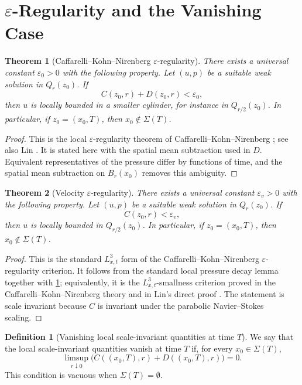 \documentclass[11pt]{amsart}
\theoremstyle{plain}
\newtheorem{theorem}{Theorem}[section]
\theoremstyle{definition}
\newtheorem{definition}[definition]{Definition}
\theoremstyle{remark}
\begin{document}
\section{\texorpdfstring{\(\varepsilon\)-Regularity}{Epsilon-Regularity} and the Vanishing Case}

\begin{theorem}[Caffarelli--Kohn--Nirenberg \(\varepsilon\)-regularity]
\label{thm:ckn}
There exists a universal constant \(\varepsilon_0>0\) with the
following property.  Let \((u,p)\) be a suitable weak solution in \(Q_r(z_0)\).
If
\[
  C(z_0,r)+D(z_0,r)<\varepsilon_0,
\]
then \(u\) is locally bounded in a smaller cylinder, for instance in
\(Q_{r/2}(z_0)\).  In particular, if \(z_0=(x_0,T)\), then
\(x_0\notin\Sigma(T)\).
\end{theorem}

\begin{proof}
This is the local \(\varepsilon\)-regularity theorem of
Caffarelli--Kohn--Nirenberg \cite{CKN1982}; see also Lin \cite{Lin1998}.  It is
stated here with the spatial mean subtraction used in \(D\).  Equivalent
representatives of the pressure differ by functions of time, and the spatial
mean subtraction on \(B_r(x_0)\) removes this ambiguity.
\end{proof}

\begin{theorem}[Velocity \(\varepsilon\)-regularity]\label{thm:velocity-ckn}
There exists a universal constant \(\varepsilon_v>0\) with the following
property.  Let \((u,p)\) be a suitable weak solution in \(Q_r(z_0)\).  If
\[
  C(z_0,r)<\varepsilon_v,
\]
then \(u\) is locally bounded in \(Q_{r/2}(z_0)\).  In particular, if
\(z_0=(x_0,T)\), then \(x_0\notin\Sigma(T)\).
\end{theorem}

\begin{proof}
This is the standard \(L^3_{x,t}\) form of the Caffarelli--Kohn--Nirenberg
\(\varepsilon\)-regularity criterion.  It follows from the standard local
pressure decay lemma together with \cref{thm:ckn}; equivalently, it is the
\(L^3_{x,t}\)-smallness criterion
proved in the Caffarelli--Kohn--Nirenberg theory and in Lin's direct proof
\cite{CKN1982,Lin1998}.  The statement is scale invariant because \(C\) is
invariant under the parabolic Navier--Stokes scaling.
\end{proof}

\begin{definition}[Vanishing local scale-invariant quantities at time \(T\)]
We say that the local scale-invariant quantities vanish at time \(T\) if, for
every \(x_0\in\Sigma(T)\),
\[
  \limsup_{r\downarrow0}
  \bigl(C((x_0,T),r)+D((x_0,T),r)\bigr)=0.
\]
This condition is vacuous when \(\Sigma(T)=\emptyset\).
\end{definition}
\end{document}
